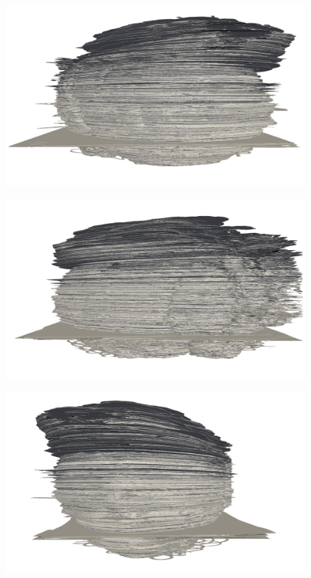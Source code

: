 \begin{figure}
  \centering
  \includegraphics[width=0.9\textheight]{Ch7/Figs/Rat28/contours/whole_positive_x_rigid}
  \caption{}
  \label{fig:image1.png}
\end{figure}

\begin{figure}
  \centering
  \includegraphics[width=0.9\textheight]{Ch7/Figs/Rat28/contours/whole_negative_x_rigid}
  \caption{}
  \label{fig:image1.png}
\end{figure}

\begin{figure}
  \centering
  \includegraphics[width=0.9\textheight]{Ch7/Figs/Rat28/contours/whole_positive_y_rigid}
  \caption{}
  \label{fig:image1.png}
\end{figure}

